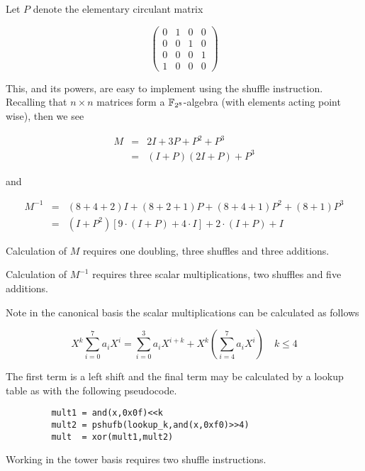 \documentclass[a4paper]{article}
\numberwithin{equation}{section}
\begin{document}
Let $P$ denote the elementary circulant matrix 

\[
\left( \begin{array}{cccc}
0 & 1 & 0 & 0 \\
0 & 0 & 1 & 0 \\
0 & 0 & 0 & 1 \\
1 & 0 & 0 & 0 
\end{array} \right)
\]

This, and its powers, are easy to implement using the shuffle instruction. Recalling that $n \times n$ matrices form a $\mathbb{F}_{2^8}$-algebra (with elements acting point wise), then we see

\begin{eqnarray*}
 M &=& 2 I + 3 P + P^2 + P^3 \\
     &=& \left(I + P\right)\left(2I + P\right) + P^3
\end{eqnarray*}

and

\begin{eqnarray*}
 M^{-1} &=& \left(8+4+2\right)I + \left(8+2+1\right)P + \left(8+4+1\right)P^2 + \left(8+1\right)P^3 \\
    &=& \left(I + P^2\right)\left[ 9 \cdot \left(I + P\right) +4 \cdot I \right] + 2 \cdot \left(I + P\right) + I
\end{eqnarray*}

Calculation of $M$ requires one doubling, three shuffles and three additions.

Calculation of $M^{-1}$ requires three scalar multiplications, two shuffles and five additions.

Note in the canonical basis the scalar multiplications can be calculated as follows

	$$ X^k \sum_{i=0}^7 a_i X^i = \sum_{i=0}^3 a_i X^{i+k} + X^k \left( \sum_{i=4}^7 a_i X^i \right) \quad k \leq 4 $$
	
The first term is a left shift and the final term may be calculated by a lookup table as with the following pseudocode.

\begin{verbatim}
         mult1 = and(x,0x0f)<<k
         mult2 = pshufb(lookup_k,and(x,0xf0)>>4)
         mult  = xor(mult1,mult2)
\end{verbatim}

Working in the tower basis requires two shuffle instructions.



\end{document}
